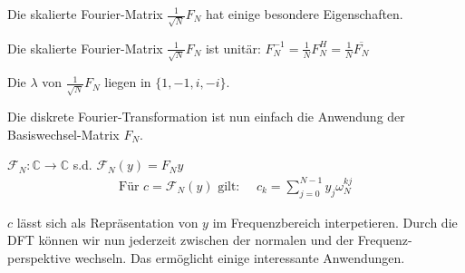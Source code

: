 Die skalierte Fourier-Matrix $\frac{1}{\sqrt{N}}F_N$ hat einige besondere Eigenschaften.

\setcounter{all}{6}
\inlinetheorem Die skalierte Fourier-Matrix $\frac{1}{\sqrt{N}}F_N$ ist unitär: $F_N^{-1} = \frac{1}{N} F_N^H = \frac{1}{N} \overline{F_N}$

 Die $\lambda$ von $\frac{1}{\sqrt{N}}F_N$ liegen in $\{1,-1,i,-i\}$.

Die diskrete Fourier-Transformation ist nun einfach die Anwendung der Basiswechsel-Matrix $F_N$.

\setcounter{all}{5}
 $\mathcal{F}_N: \mathbb{C} \to \mathbb{C}$ s.d. $\mathcal{F}_N(y) = F_Ny$
\begin{align*}
    \text{Für } c = \mathcal{F}_N(y) \text{ gilt: }\quad c_k = \sum_{j=0}^{N-1} y_j \omega_N^{kj}
\end{align*}

$c$ lässt sich als Repräsentation von $y$ im Frequenzbereich interpetieren. Durch die DFT können wir nun jederzeit zwischen der normalen und der Frequenz-perspektive wechseln. Das ermöglicht einige interessante Anwendungen.
